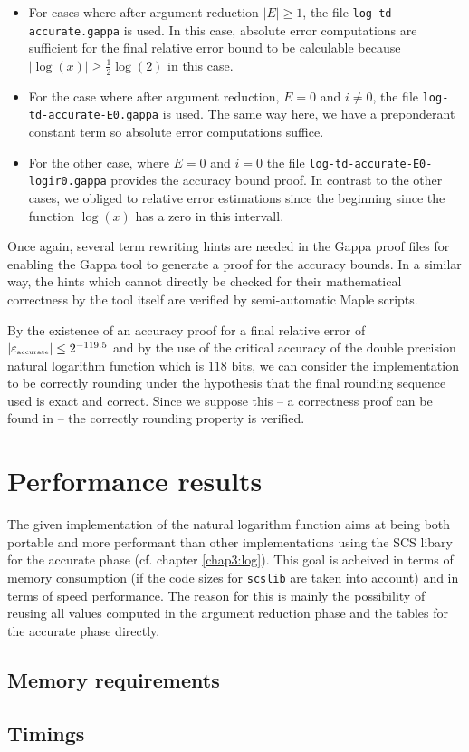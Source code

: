 \begin{itemize}
\item For cases where after argument reduction $\left \vert E \right \vert \geq 1$, 
the file {\tt log-td-accurate.gappa} is used. In this case, absolute error computations are sufficient 
for the final relative error bound to be calculable because 
$\left \vert \log\left( x \right) \right \vert \geq \frac{1}{2} \log\left( 2 \right)$ in this case.
\item For the case where after argument reduction, $E = 0$ and $i \not = 0$, the file 
{\tt log-td-accurate-E0.gappa} is used. The same way here, we have a preponderant constant term so absolute
error computations suffice.
\item For the other case, where $E=0$ and $i=0$ the file {\tt log-td-accurate-E0-logir0.gappa} provides the 
accuracy bound proof. In contrast to the other cases, we obliged to relative error estimations since the beginning
since the function $\log\left( x \right)$ has a zero in this intervall.
\end{itemize}
Once again, several term rewriting hints are needed in the Gappa proof files for enabling the Gappa tool to 
generate a proof for the accuracy bounds. In a similar way, the hints which cannot directly be checked for their 
mathematical correctness by the tool itself are verified by semi-automatic Maple scripts.\par
By the existence of an accuracy proof for a final relative error of $\left \vert \epsilon_{\mbox{\tiny accurate}} \right \vert \leq 2^{-119.5}$ and
by the use of the critical accuracy of the double precision natural logarithm function which is 
$118$ bits\cite{DinDefLau2004LIP}, we can consider the implementation to be correctly rounding under the hypothesis
that the final rounding sequence used is exact and correct. Since we suppose this -- a correctness proof can be 
found in \cite{Lau05} -- the correctly rounding property is verified.
\section{Performance results}
The given implementation of the natural logarithm function aims at being both portable and more performant than
other implementations using the SCS libary for the accurate phase (cf. chapter \ref{chap3:log}). 
This goal is acheived in terms of memory consumption
(if the code sizes for {\tt scslib} are taken into account) and in terms of speed performance. The reason for this
is mainly the possibility of reusing all values computed in the argument reduction phase and the tables for the 
accurate phase directly. 
\subsection{Memory requirements}



\subsection{Timings}